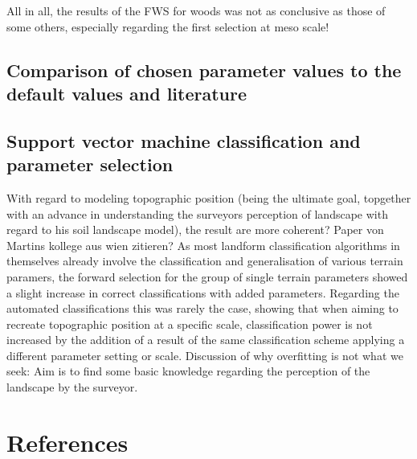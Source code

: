 \documentclass[final,1p,times,twocolumn,authoryear]{elsarticle}
\begin{document}
All in all, the results of the FWS for woods was not as conclusive as those of some others, especially regarding the first selection at meso scale!
\subsection{Comparison of chosen parameter values to the default values and literature} 



\subsection{Support vector machine classification and parameter selection}
With regard to modeling topographic position (being the ultimate goal, topgether with an advance in understanding the surveyors perception of landscape with regard to his soil landscape model), the result are more coherent? Paper von Martins kollege aus wien zitieren?
As most landform classification algorithms in themselves already involve the classification and generalisation of various terrain paramers, the forward selection for the group of single terrain parameters showed a slight increase in correct classifications with added parameters. Regarding the automated classifications this was rarely the case, showing that when aiming to recreate topographic position at a specific scale, classification power is not increased by the addition of a result of the same classification scheme applying a different parameter setting or scale.
Discussion of why overfitting is not what we seek: Aim is to find some basic knowledge regarding the perception of the landscape by the surveyor.


\clearpage
\section*{References}

\end{document}
